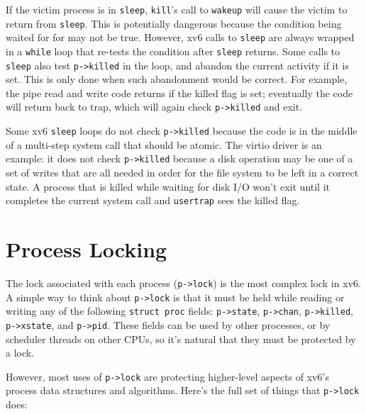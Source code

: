 If the victim process is in
\lstinline{sleep},
\lstinline{kill}'s call to
\lstinline{wakeup}
will cause the victim to return from
\lstinline{sleep}.
This is potentially dangerous because 
the condition being waited for for may not be true.
However, xv6 calls to
\lstinline{sleep}
are always wrapped in a
\lstinline{while}
loop that re-tests the condition after
\lstinline{sleep}
returns.
Some calls to
\lstinline{sleep}
also test
\lstinline{p->killed}
in the loop, and abandon the current activity if it is set.
This is only done when such abandonment would be correct.
For example, the pipe read and write code
returns if the killed flag is set; eventually the
code will return back to trap, which will again
check \lstinline{p->killed} and exit.

Some xv6 
\lstinline{sleep}
loops do not check
\lstinline{p->killed} 
because the code is in the middle of a multi-step
system call that should be atomic.
The virtio driver
is an example: it does not check
\lstinline{p->killed}
because a disk operation may be one of a set of
writes that are all needed in order for the file system to
be left in a correct state.
A process that is killed while waiting for disk I/O won't
exit until it completes the current system call and
\lstinline{usertrap} sees the killed flag.

\section{Process Locking}

The lock associated with each process (\lstinline{p->lock}) is the
most complex lock in xv6.
A simple way to think about \lstinline{p->lock} is
that it must be held while reading or writing any of the following
\lstinline{struct proc} fields:
\lstinline{p->state},
\lstinline{p->chan},
\lstinline{p->killed},
\lstinline{p->xstate},
and
\lstinline{p->pid}.
These fields can be used by other processes, or by scheduler
threads on other CPUs, so it's natural that they
must be protected by a lock.

However, most uses of \lstinline{p->lock} are protecting higher-level
aspects of xv6's process data structures and algorithms. Here's
the full set of things that \lstinline{p->lock} does:



